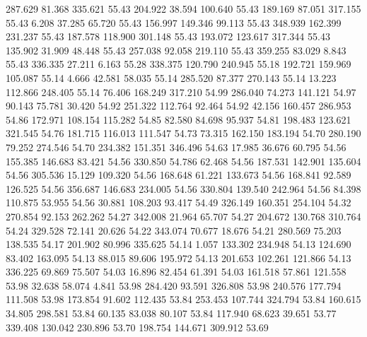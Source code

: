  287.629   81.368  335.621        55.43
 204.922   38.594  100.640        55.43
 189.169   87.051  317.155        55.43
   6.208   37.285   65.720        55.43
 156.997  149.346   99.113        55.43
 348.939  162.399  231.237        55.43
 187.578  118.900  301.148        55.43
 193.072  123.617  317.344        55.43
 135.902   31.909   48.448        55.43
 257.038   92.058  219.110        55.43
 359.255   83.029    8.843        55.43
 336.335   27.211    6.163        55.28
 338.375  120.790  240.945        55.18
 192.721  159.969  105.087        55.14
   4.666   42.581   58.035        55.14
 285.520   87.377  270.143        55.14
  13.223  112.866  248.405        55.14
  76.406  168.249  317.210        54.99
 286.040   74.273  141.121        54.97
  90.143   75.781   30.420        54.92
 251.322  112.764   92.464        54.92
  42.156  160.457  286.953        54.86
 172.971  108.154  115.282        54.85
  82.580   84.698   95.937        54.81
 198.483  123.621  321.545        54.76
 181.715  116.013  111.547        54.73
  73.315  162.150  183.194        54.70
 280.190   79.252  274.546        54.70
 234.382  151.351  346.496        54.63
  17.985   36.676   60.795        54.56
 155.385  146.683   83.421        54.56
 330.850   54.786   62.468        54.56
 187.531  142.901  135.604        54.56
 305.536   15.129  109.320        54.56
 168.648   61.221  133.673        54.56
 168.841   92.589  126.525        54.56
 356.687  146.683  234.005        54.56
 330.804  139.540  242.964        54.56
  84.398  110.875   53.955        54.56
  30.881  108.203   93.417        54.49
 326.149  160.351  254.104        54.32
 270.854   92.153  262.262        54.27
 342.008   21.964   65.707        54.27
 204.672  130.768  310.764        54.24
 329.528   72.141   20.626        54.22
 343.074   70.677   18.676        54.21
 280.569   75.203  138.535        54.17
 201.902   80.996  335.625        54.14
   1.057  133.302  234.948        54.13
 124.690   83.402  163.095        54.13
  88.015   89.606  195.972        54.13
 201.653  102.261  121.866        54.13
 336.225   69.869   75.507        54.03
  16.896   82.454   61.391        54.03
 161.518   57.861  121.558        53.98
  32.638   58.074    4.841        53.98
 284.420   93.591  326.808        53.98
 240.576  177.794  111.508        53.98
 173.854   91.602  112.435        53.84
 253.453  107.744  324.794        53.84
 160.615   34.805  298.581        53.84
  60.135   83.038   80.107        53.84
 117.940   68.623   39.651        53.77
 339.408  130.042  230.896        53.70
 198.754  144.671  309.912        53.69
